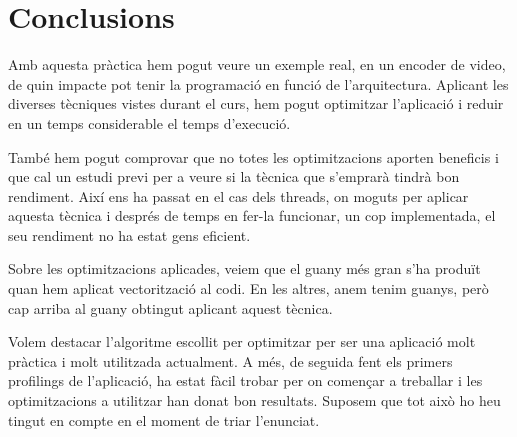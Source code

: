 \chapter{Conclusions}

Amb aquesta pràctica hem pogut veure un exemple real, en un encoder de video, de quin impacte pot tenir la programació en funció de l'arquitectura. Aplicant les diverses tècniques vistes durant el curs, hem pogut optimitzar l'aplicació i reduir en un temps considerable el temps d'execució.

També hem pogut comprovar que no totes les optimitzacions aporten beneficis i que cal un estudi previ per a veure si la tècnica que s'emprarà tindrà bon rendiment. Així ens ha passat en el cas dels threads, on moguts per aplicar aquesta tècnica i després de temps en fer-la funcionar, un cop implementada, el seu rendiment no ha estat gens eficient. 

Sobre les optimitzacions aplicades, veiem que el guany més gran s'ha produït quan hem aplicat vectorització al codi. En les altres, anem tenim guanys, però cap arriba al guany obtingut aplicant aquest tècnica. 

Volem destacar l'algoritme escollit per optimitzar per ser una aplicació molt pràctica i molt utilitzada actualment. A més, de seguida fent els primers profilings de l'aplicació, ha estat fàcil trobar per on començar a treballar i les optimitzacions a utilitzar han donat bon resultats. Suposem que tot això ho heu tingut en compte en el moment de triar l'enunciat.
